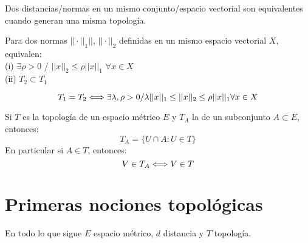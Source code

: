     \begin{definicion}
        Dos distancias/normas en un mismo conjunto/espacio vectorial son equivalentes cuando generan una misma topología. 
    \end{definicion}
    \begin{prop} 
        Para dos normas $||\cdot ||_1||$, $||\cdot ||_2$ definidas en un mismo espacio vectorial $X$, equivalen: \\
        
        (i)  $\exists \rho >0$ / $||x||_2 \leq \rho ||x||_1$  $\forall x \in X$ \\
        
        (ii)  $T_2 \subset T_1$
    \end{prop}

    
    \begin{coro}
        $$T_1 = T_2 \\ \Longleftrightarrow \\ \exists \lambda, \rho >0 \\ /\\ \lambda ||x||_1 \leq ||x||_2 \leq \rho ||x||_1 \\  \forall x \in X$$
    \end{coro}
    
    \begin{definicion}
        Si $T$ es la topología de un espacio métrico $E$ y $T_A$ la de un subconjunto $A \subset E$, entonces: \\
        $$T_A = \{ U\cap A : U \in T\}$$
        En particular si $A\in T$, entonces:
        $$V \in T_A \\ \Longleftrightarrow \\ V \in T$$
    \end{definicion}

\section{Primeras nociones topológicas}
    En todo lo que sigue $E$ espacio métrico, $d$ distancia y $T$ topología.

